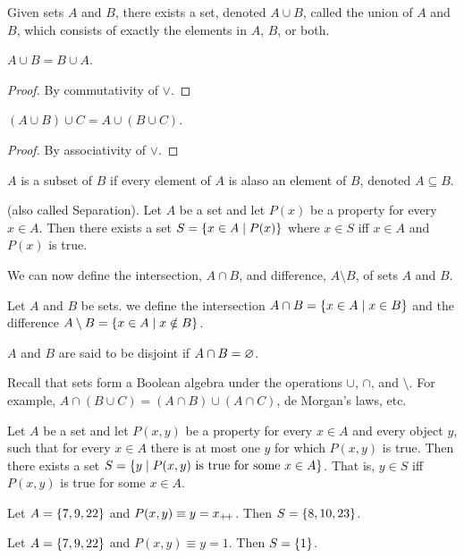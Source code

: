 \begin{axiom} \label{def:zfc:pairwise_union}
    Given sets $A$ and $B$, there exists a set, denoted $A \cup B$, called the
    union of $A$ and $B$, which consists of exactly the elements in $A$, $B$, or
    both.
\end{axiom}

\begin{problem}
    $A \cup B = B \cup A$.
\end{problem}
\begin{proof}
    By commutativity of $\lor$.
\end{proof}
\begin{problem}
    $(A \cup B) \cup C = A \cup (B \cup C)$.
\end{problem}
\begin{proof}
    By associativity of $\lor$.
\end{proof}

\begin{definition}[Subset] \label{def:zfc:subset}
    $A$ is a subset of $B$ if every element of $A$ is alaso an element of $B$,
    denoted $A \subseteq B$.
\end{definition}

\begin{axiom}[Specification] \label{def:zfc:specification}
    (also called Separation).
    Let $A$ be a set and let $P(x)$ be a property for every $x \in A$.
    Then there exists a set $S = \set{x \in A \mid P(x)}$ where $x \in S$ iff
    $x \in A$ and $P(x)$ is true.
\end{axiom}
We can now define the intersection, $A \cap B$, and difference, $A \setminus B$,
of sets $A$ and $B$.
\begin{definition}
    Let $A$ and $B$ be sets.
    we define the intersection $A \cap B = \set{x \in A \mid x \in B}$ and the
    difference $A \setminus B = \set{x \in A \mid x \notin B}$.

    $A$ and $B$ are said to be disjoint if $A \cap B = \varnothing$.
\end{definition}

Recall that sets form a Boolean algebra under the operations $\cup$, $\cap$, and
$\setminus$.
For example, $A \cap (B \cup C) = (A \cap B) \cup (A \cap C)$, de Morgan's laws,
etc.

\begin{axiom}[Replacement] \label{def:zfc:replacement}
    Let $A$ be a set and let $P(x, y)$ be a property for every $x \in A$ and
    every object $y$, such that for every $x \in A$ there is at most one $y$ for
    which $P(x, y)$ is true.
    Then there exists a set $S = \set{y \mid P(x, y) \text{ is true for some }
    x \in A}$.
    That is, $y \in S$ iff $P(x, y)$ is true for some $x \in A$.
\end{axiom}
\begin{examples}
    \item Let $A = \set{7, 9, 22}$ and $P(x, y) \equiv y = x_{+\!+}$.
    Then $S = \set{8, 10, 23}$.
    \item Let $A = \set{7, 9, 22}$ and $P(x, y) \equiv y = 1$.
    Then $S = \set{1}$.
\end{examples}


